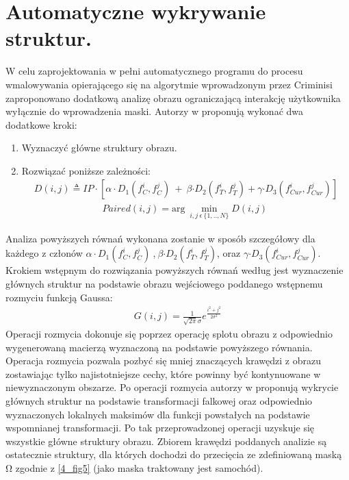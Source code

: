 \documentclass[12pt, twoside, openany]{report}
\theoremstyle{definition}
\begin{document}
\section{Automatyczne wykrywanie struktur.}
W celu zaprojektowania w pełni automatycznego programu do procesu wmalowywania opierającego się na algorytmie wprowadzonym przez Criminisi zaproponowano dodatkową analizę obrazu ograniczającą interakcję użytkownika wyłącznie do wprowadzenia maski. Autorzy w \cite{SalientStrucTexProp} proponują wykonać dwa dodatkowe kroki:
\begin{enumerate}
\item
Wyznaczyć główne struktury obrazu.
\item
Rozwiązać poniższe zależności:
\begin{align}
D(i,j)\triangleq IP\cdot \left[\alpha \cdot D_1\left(f^i_C,f^j_C\right)\ +\ \beta {\cdot D}_2\left(f^i_T,f^j_T\right)+\gamma {\cdot D}_3\left(f^i_{Cur},f^j_{Cur}\right)\right]
\label{SalientDistance}
\end{align}
\begin{align}
Paired\left(i,j\right)={\mathrm{arg}\ \mathop{\mathrm{min}}_{i,j\ \epsilon \mathrm{\ }\{1,..,N\}} D(i,j)\ }
\label{SalientPair}
\end{align}
\end{enumerate}
Analiza powyższych równań wykonana zostanie w sposób szczegółowy dla każdego z członów $\alpha \cdot D_1\left(f^i_C,f^j_C\right)\ $,$\ \beta {\cdot D}_2\left(f^i_T,f^j_T\right)$, oraz $\gamma {\cdot D}_3\left(f^i_{Cur},f^j_{Cur}\right)$. Krokiem wstępnym do rozwiązania powyższych równań według \cite{SalientStrucTexProp} jest wyznaczenie głównych struktur na podstawie obrazu wejściowego poddanego wstępnemu rozmyciu funkcją Gaussa:
\begin{align}
G\left(i,j\right)=\frac{1}{\sqrt{2\pi }\sigma }e^{\frac{i^2+j^2}{2{\sigma }^2}}
\label{rozmycieGaussa}
\end{align}
Operacji rozmycia dokonuje się poprzez operację splotu obrazu z odpowiednio wygenerowaną macierzą wyznaczoną na podstawie powyższego równania. Operacja rozmycia pozwala pozbyć się mniej znaczących krawędzi z obrazu zostawiając tylko najistotniejsze cechy, które powinny być kontynuowane w niewyznaczonym obszarze. Po operacji rozmycia autorzy w \cite{SalientStrucTexProp} proponują wykrycie głównych struktur na podstawie transformacji falkowej oraz odpowiednio wyznaczonych lokalnych maksimów dla funkcji powstałych na podstawie wspomnianej transformacji. Po tak  przeprowadzonej operacji uzyskuje się wszystkie główne struktury obrazu. Zbiorem krawędzi poddanych analizie są ostatecznie struktury, dla których dochodzi do przecięcia ze zdefiniowaną maską $\mathrm{\Omega }$ zgodnie z \autoref{4_fig5} (jako maska traktowany jest samochód).
\end{document}
